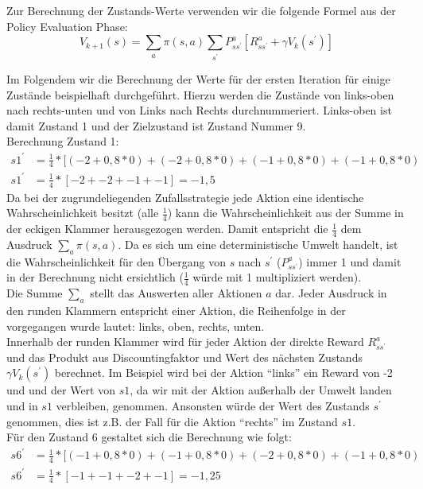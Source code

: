 \documentclass[10pt]{scrartcl}
\begin{document}
Zur Berechnung der Zustands-Werte verwenden wir die folgende Formel aus der Policy Evaluation Phase:
\begin{equation}
V_{k+1}(s) = \sum_{a} \pi(s,a) \sum_{s^{'}} P^a_{ss^{'}} [R^a_{ss^{'}} + \gamma V_{k} (s^{'})]
\end{equation}

Im Folgendem wir die Berechnung der Werte für der ersten Iteration für einige Zustände beispielhaft durchgeführt.
Hierzu werden die Zustände von links-oben nach rechts-unten und von Links nach Rechts durchnummeriert.
Links-oben ist damit Zustand 1 und der Zielzustand ist Zustand Nummer 9.\\

Berechnung Zustand 1:
\begin{align}
	s1^{'} &= \frac{1}{4} * [(-2 + 0,8 * 0) + (-2 + 0,8 * 0) + (-1 + 0,8 * 0) + (-1 + 0,8 * 0)\\
	s1^{'} &= \frac{1}{4} * [ -2 + -2 + -1 + -1 ] = -1,5
\end{align}
Da bei der zugrundeliegenden Zufallsstrategie jede Aktion eine identische Wahrscheinlichkeit besitzt (alle $\frac{1}{4}$) kann die Wahrscheinlichkeit aus der Summe in der eckigen Klammer herausgezogen werden.
Damit entspricht die $\frac{1}{4}$ dem Ausdruck $\sum_{a} \pi(s,a)$. 
Da es sich um eine deterministische Umwelt handelt, ist die Wahrscheinlichkeit für den Übergang von $s$ nach $s^{'}$ ($P^a_{ss^{'}}$) immer 1 und damit in der Berechnung nicht ersichtlich ($\frac{1}{4}$ würde mit 1 multipliziert werden).\\
Die Summe $\sum_{a}$ stellt das Auswerten aller Aktionen $a$ dar.
Jeder Ausdruck in den runden Klammern entspricht einer Aktion, die Reihenfolge in der vorgegangen wurde lautet: links, oben, rechts, unten.\\
Innerhalb der runden Klammer wird für jeder Aktion der direkte Reward $R^a_{ss^{'}}$ und das Produkt aus Discountingfaktor und Wert des nächsten Zustands $\gamma V_{k} (s^{'})$ berechnet.
Im Beispiel wird bei der Aktion "`links"' ein Reward von -2 und und der Wert von $s1$, da wir mit der Aktion außerhalb der Umwelt landen und in $s1$ verbleiben, genommen.
Ansonsten würde der Wert des Zustands $s^{'}$ genommen, dies ist z.B. der Fall für die Aktion "`rechts"' im Zustand $s1$.\\

Für den Zustand 6 gestaltet sich die Berechnung wie folgt:
\begin{align}
	s6^{'} &= \frac{1}{4} * [(-1 + 0,8 * 0) + (-1 + 0,8 * 0) + (-2 + 0,8 * 0) + (-1 + 0,8 * 0)\\
	s6^{'} &= \frac{1}{4} * [ -1 + -1 + -2 + -1 ] = -1,25
\end{align}
\end{document}
